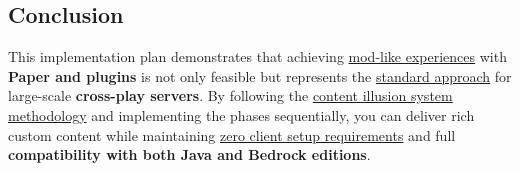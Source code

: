 \documentclass{article}
\begin{document}
\subsection{Conclusion}

This implementation plan demonstrates that achieving \uline{mod-like experiences} with \textbf{Paper and plugins} is not only feasible but represents the \uline{standard approach} for large-scale \textbf{cross-play servers}. By following the \uline{content illusion system methodology} and implementing the phases sequentially, you can deliver rich custom content while maintaining \uline{zero client setup requirements} and full \textbf{compatibility with both Java and Bedrock editions}.
\end{document}
